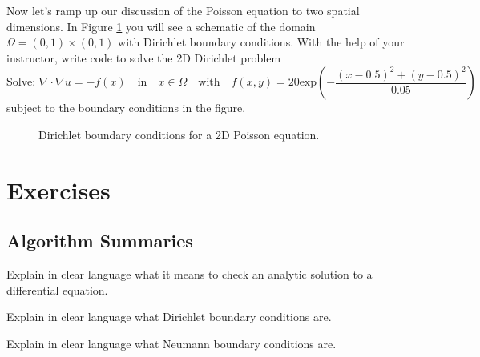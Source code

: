 \begin{problem}
    Now let's ramp up our discussion of the Poisson equation to two spatial dimensions.
    In Figure \ref{fig:2DPoisson_BC} you will see a schematic of the domain
    $\Omega=(0,1)\times (0,1)$ with Dirichlet boundary conditions.  With the help of your
    instructor, write code to solve the 2D Dirichlet problem
    \[ \text{Solve: } \nabla \cdot \nabla u = - f(x) \quad \text{in} \quad x \in \Omega \quad \text{with} \quad
    f(x,y) = 20\text{exp}\left( -\frac{(x-0.5)^2 + (y-0.5)^2}{0.05} \right) \]
    subject to the boundary conditions in the figure.

    \begin{figure}[ht!]
        \centering
        \caption{Dirichlet boundary conditions for a 2D Poisson equation.}
        \label{fig:2DPoisson_BC}
    \end{figure}
\end{problem}






\newpage\section{Exercises}

\subsection{Algorithm Summaries}

\begin{problem}
    Explain in clear language what it means to check an analytic solution to a
    differential equation.
\end{problem}

\begin{problem}
    Explain in clear language what Dirichlet boundary conditions are.
\end{problem}

\begin{problem}
    Explain in clear language what Neumann boundary conditions are.
\end{problem}

